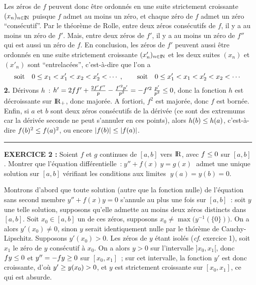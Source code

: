 \documentclass{article}
\begin{document}
\msk\sect
Les z\'eros de $f$ peuvent donc \^etre ordonn\'es en une suite strictement croissante $(x_n)_{n\in{\rm I\kern-0.5mm N}}$ puisque $f$ admet au moins un z\'ero, et chaque z\'ero de $f$ admet un z\'ero ``cons\'ecutif''.\ssk\sect
Par le th\'eor\`eme de Rolle, entre deux z\'eros cons\'ecutifs de $f$, il y a au moins un z\'ero de $f'$. Mais, entre deux z\'eros de $f'$, il y a au moins un z\'ero de $f''$ qui est aussi un z\'ero de $f$. En conclusion, les z\'eros de $f'$ peuvent aussi \^etre ordonn\'es en une suite strictement croissante $(x'_n)_{n\in{\rm I\kern-0.5mm N}}$ et les deux suites $(x_n)$ et $(x'_n)$ sont ``entrelac\'ees'', c'est-\`a-dire que l'on a\vv
$${\rm soit}\quad 0\leq x_1<x'_1<x_2<x'_2<\cdots\;,\qquad{\rm soit}\quad 0\leq x'_1<x_1<x'_2<x_2<\cdots$$
\ssk
{\bf 2.} D\'erivons $h$~: $h'=2ff'+{2f'f''\over p}-{f'^2p'\over p^2}=-f'^2\>{p'\over p^2}\leq 0$, donc la fonction $h$ est d\'ecroissante sur ${\rm I\kern-0.6mm R}_+$, donc major\'ee. A fortiori, $f^2$ est major\'ee, donc $f$ est born\'ee. Enfin, si $a$ et $b$ sont deux z\'eros cons\'ecutifs de la d\'eriv\'ee (ce sont des extremums car la d\'eriv\'ee seconde ne peut s'annuler en ces points), alors $h(b)\leq h(a)$, c'est-\`a-dire $f(b)^2\leq f(a)^2$, ou encore $|f(b)|\leq|f(a)|$.

\bsk
\hrule
\bsk

{\bf EXERCICE 2 :}\msk
Soient $f$ et $g$ continues de $[a,b]$ vers ${\rm I\kern-0.6mm R}$, avec $f\leq0$ sur $[a,b]$. Montrer que l'\'equation diff\'erentielle~:$\;y''+f(x)\>y=g(x)\;$ admet une unique solution sur $[a,b]$ v\'erifiant les conditions aux limites $\;y(a)=y(b)=0$.


\msk
\cl{- - - - - - - - - - - - - - - - - - - - - - - - - - - - - - - }
\msk

Montrons d'abord que toute solution (autre que la fonction nulle) de l'\'equation sans second membre $y''+f(x)y=0$ s'annule au plus une fois sur $[a,b]$~: soit $y$ une telle solution, supposons qu'elle admette au moins deux z\'eros distincts dans $[a,b]$. Soit $x_0\in[a,b]$ un de ces z\'eros, supposons $x_0\not=\max\big(y^{-1}(\{0\})\big)$. On a alors $y'(x_0)\not=0$, sinon $y$ serait identiquement nulle par le th\'or\`eme de Cauchy-Lipschitz. Supposons $y'(x_0)>0$. Les z\'eros de $y$ \'etant isol\'es ({\it cf}. exercice 1), soit $x_1$ le z\'ero de $y$ cons\'ecutif \`a $x_0$. On a alors $y>0$ sur l'intervalle $]x_0,x_1[$, donc $fy\leq0$ et $y''=-fy\geq0$ sur $[x_0,x_1]$~; sur cet intervalle, la fonction $y'$ est donc croissante, d'o\`u $y'\geq y(x_0)>0$, et $y$ est strictement croissante sur $[x_0,x_1]$, ce qui est absurde.
\end{document}
